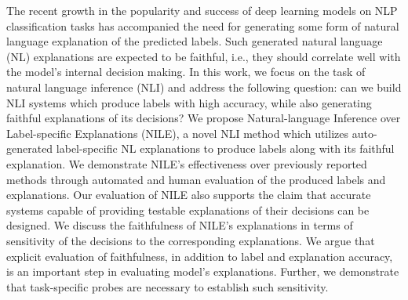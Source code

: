 The recent growth in the popularity and success of deep learning models on NLP classification tasks has accompanied the need for generating some form of  natural language explanation of the predicted labels. Such generated natural language (NL) explanations are expected to be faithful, i.e., they should correlate well with the model's internal  decision making. In this work, we focus on the task of natural language inference (NLI) and address the following question: can we build NLI systems which produce labels with high accuracy, while also generating faithful explanations of its decisions? We propose Natural-language Inference over Label-specific Explanations (NILE), a novel NLI method which utilizes auto-generated label-specific NL explanations to produce labels along with its faithful explanation. We demonstrate NILE's effectiveness over previously reported methods through automated and human evaluation of the produced labels and explanations. Our evaluation of NILE also supports the claim that accurate systems capable of providing testable explanations of their decisions can be designed. We discuss the faithfulness of NILE's explanations in terms of sensitivity of the decisions to the corresponding explanations. We argue that explicit evaluation of faithfulness, in addition to label and explanation accuracy, is an important step in evaluating model's explanations. Further, we demonstrate that task-specific probes are necessary to establish  such sensitivity.
